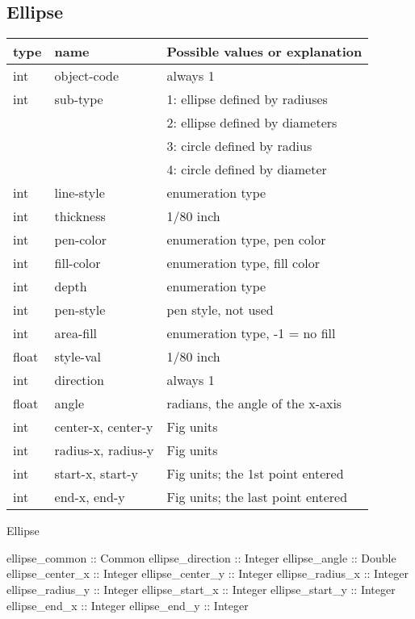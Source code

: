 \documentclass[10pt, a4paper]{article}
\begin{document}
\subsection{Ellipse}\label{subsec:ellipse}


\begin{tabular}{|lll|}
\hline
type & name & Possible values or explanation \\
\hline
\hline
int   &  object-code             & always 1 \\
int   &  sub-type                & 1: ellipse defined by radiuses \\
&&                                 2: ellipse defined by diameters \\
&&                                 3: circle defined by radius \\
&&                                 4: circle defined by diameter \\
int   &  line-style              & enumeration type \\
int   &  thickness               & 1/80 inch \\
int   &  pen-color               & enumeration type, pen color \\
int   &  fill-color              & enumeration type, fill color \\
int   &  depth                   & enumeration type \\
int   &  pen-style               & pen style, not used \\
int   &  area-fill               & enumeration type, -1 = no fill \\
float &  style-val               & 1/80 inch \\
int   &  direction               & always 1 \\
float &  angle                   & radians, the angle of the x-axis \\
int   &  center-x, center-y      & Fig units \\
int   &  radius-x, radius-y      & Fig units \\
int   &  start-x, start-y        & Fig units; the 1st point entered \\
int   &  end-x, end-y            & Fig units; the last point entered \\
\hline
\end{tabular}


Ellipse	 

ellipse\_common :: Common
ellipse\_direction :: Integer
ellipse\_angle :: Double
ellipse\_center\_x :: Integer
ellipse\_center\_y :: Integer
ellipse\_radius\_x :: Integer
ellipse\_radius\_y :: Integer
ellipse\_start\_x :: Integer
ellipse\_start\_y :: Integer
ellipse\_end\_x :: Integer
ellipse\_end\_y :: Integer
\end{document}
